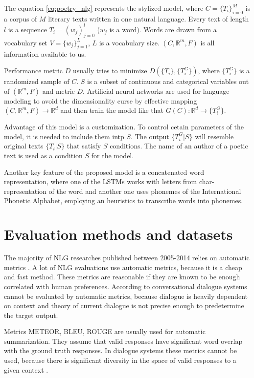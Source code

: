 The equation \ref{eq:poetry_nlg} represents the stylized model, where $C = \{ T_i\}^M_{i=0}$ is a corpus of $M$ literary texts written in one natural language. Every text of length $l$ is a sequence $T_i = (w_j)^l_{j=0}$ ($w_j$ is a word). Words are drawn from a vocabulary set $V = \{ w_j \}^L_{j=1}$, $L$ is a vocabulary size. $(C, \mathbb{R}^m, F)$ is all information available to us.

Performance metric $D$ usually tries to minimize $D(\{T_i\}, \{T_i^G\})$, where $\{T_i^G\}$ is a randomized sample of $C$. $S$ is a subset of continuous and categorical variables out of $(\mathbb{R}^m, F)$ and metric $D$. Artificial neural networks are used for language modeling to avoid the dimensionality curse by effective mapping $(C,\mathbb{R}^m, F) \rightarrow \mathbb{R}^d$ and then train the model like that $G(C):\mathbb{R}^d \rightarrow \{ T_i^G\}$. 

Advantage of this model is a customization. To control cetain parameters of the model, it is needed to include them intp $S$. The output $\{T_i^G|S\}$ will resemble original texts $\{T_i|S\}$ that satisfy $S$ conditions. The name of an author of a poetic text is used as a condition $S$ for the model. 

Another key feature of the proposed model is a concatenated word representation, where one of the LSTMs works with letters from char-representation of the word and another one uses phonemes of the International Phonetic Alphabet, employing an heuristics to transcribe words into phonemes.
 
\chapter{Evaluation methods and datasets}
The majority of NLG researches published between 2005-2014 relies on automatic metrics \cite{gkatzia2015snapshot}. A lot of NLG evaluations use automatic metrics, because it is a cheap and fast method. These metrics are reasonable if they are known to be enough correlated with human preferences. According to \cite{artstein2009semi} conversational dialogue systems cannot be evaluated by automatic metrics, because dialogue is heavily dependent on context and theory of current dialogue is not precise enough to predetermine the target output.  

Metrics METEOR, BLEU, ROUGE are usually used for automatic summarization. They assume that valid responses have significant word overlap with the ground truth responses. In dialogue systems these metrics cannot be used, because there is significant diversity in the space of valid responses to a given context \cite{liu2016not}.

